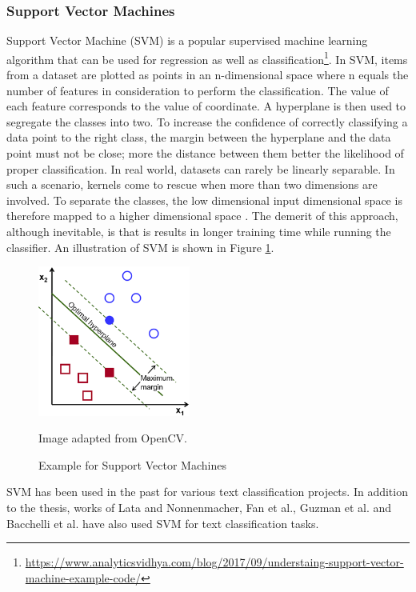 \documentclass[a4paper,12pt,twoside]{report}
\begin{document}
\subsubsection{Support Vector Machines}
Support Vector Machine (\acs{SVM}) is a popular supervised machine learning algorithm that can be used for regression as well as classification\footnote{\url{https://www.analyticsvidhya.com/blog/2017/09/understaing-support-vector-machine-example-code/}}. In \acs{SVM}, items from a dataset are plotted as points in an n-dimensional space where n equals the number of features in consideration to perform the classification. The value of each feature corresponds to the value of coordinate. A hyperplane is then used to segregate the classes into two. To increase the confidence of correctly classifying a data point to the right class, the margin between the hyperplane and the data point must not be close; more the distance between them better the likelihood of proper classification\cite{Joachims1998a}.  
\newline \newline
In real world, datasets can rarely be linearly separable. In such a scenario, kernels come to rescue when more than two dimensions are involved. To separate the classes, the low dimensional input dimensional space is therefore mapped to a higher dimensional space \cite{Tong2001}. The demerit of this approach, although inevitable, is that is results in longer training time while running the classifier. An illustration of \acs{SVM} is shown in Figure \ref{fig:svm}. 
\begin{figure}[h] %
    \centering
    \includegraphics[width=5cm]{optimal-hyperplane}
    \caption{Example for Support Vector Machines}
    \small Image adapted from OpenCV\footnotemark.
    \label{fig:svm}
\end{figure}
\newline \newline
\acs{SVM} has been used in the past for various text classification projects. In addition to the thesis, works of Lata \cite{Lata2016} and Nonnenmacher\cite{Nonnenmacher2017}, Fan et al.\cite{Fan2017}, Guzman et al.\cite{Guzman2016} and Bacchelli et al.\cite{Bacchelli2012} have also used \acs{SVM} for text classification tasks. 
\end{document}
